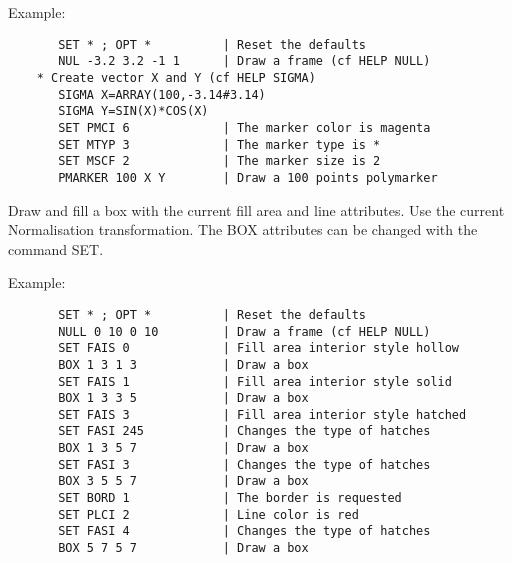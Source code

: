    \par
Example:  
\begin{verbatim}
       SET * ; OPT *          | Reset the defaults
       NUL -3.2 3.2 -1 1      | Draw a frame (cf HELP NULL)
    * Create vector X and Y (cf HELP SIGMA)
       SIGMA X=ARRAY(100,-3.14#3.14)
       SIGMA Y=SIN(X)*COS(X)
       SET PMCI 6             | The marker color is magenta
       SET MTYP 3             | The marker type is *
       SET MSCF 2             | The marker size is 2
       PMARKER 100 X Y        | Draw a 100 points polymarker
\end{verbatim}

\ENDCMD


\BEGARG
{}
\ENDARG

   \par
Draw and fill a box with the current fill area and line attributes.  Use 
   the current Normalisation transformation.  The BOX attributes can be 
   changed with the command SET.  

   \par
Example:  
\begin{verbatim}
       SET * ; OPT *          | Reset the defaults
       NULL 0 10 0 10         | Draw a frame (cf HELP NULL)
       SET FAIS 0             | Fill area interior style hollow
       BOX 1 3 1 3            | Draw a box
       SET FAIS 1             | Fill area interior style solid
       BOX 1 3 3 5            | Draw a box
       SET FAIS 3             | Fill area interior style hatched
       SET FASI 245           | Changes the type of hatches
       BOX 1 3 5 7            | Draw a box
       SET FASI 3             | Changes the type of hatches
       BOX 3 5 5 7            | Draw a box
       SET BORD 1             | The border is requested
       SET PLCI 2             | Line color is red
       SET FASI 4             | Changes the type of hatches
       BOX 5 7 5 7            | Draw a box
\end{verbatim}

\ENDCMD


\BEGARG
{}
\ENDARG


